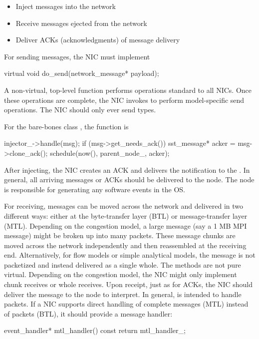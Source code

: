 \begin{itemize}
\item Inject messages into the network
\item Receive messages ejected from the network
\item Deliver ACKs (acknowledgments) of message delivery
\end{itemize}

For sending messages, the NIC must implement

\begin{CppCode}
  virtual void
  do_send(network_message* payload);
\end{CppCode}
A non-virtual, top-level  function performs operations standard to all NICs.
Once these operations are complete, the NIC invokes  to perform model-specific send operations.
The NIC should only ever send  types.

For the bare-bones class , the function is

\begin{CppCode}
  injector_->handle(msg);
  if (msg->get_needs_ack()) {
    sst_message* acker = msg->clone_ack();
    schedule(now(), parent_node_, acker);
  }
\end{CppCode}
After injecting, the NIC creates an ACK and delivers the notification to the \nodecls.
In general, all arriving messages or ACKs should be delivered to the node.
The node is responsible for generating any software events in the OS.

For receiving, messages can be moved across the network and delivered in two different ways:
either at the byte-transfer layer (BTL) or message-transfer layer (MTL).
Depending on the congestion model, a large message (say a 1 MB MPI message) might be broken up into many packets.
These message chunks are moved across the network independently and then reassembled at the receiving end.
Alternatively, for flow models or simple analytical models, the message is not packetized and instead delivered as a single whole.
The methods are not pure virtual.  Depending on the congestion model,  the NIC might only implement chunk receives or whole receives.
Upon receipt, just as for ACKs, the NIC should deliver the message to the node to interpret.
In general,  is intended to handle packets. 
If a NIC supports direct handling of complete messages (MTL) instead of packets (BTL),
it should provide a message handler:

\begin{CppCode}
event_handler*
mtl_handler() const {
  return mtl_handler_;
}
\end{CppCode}

